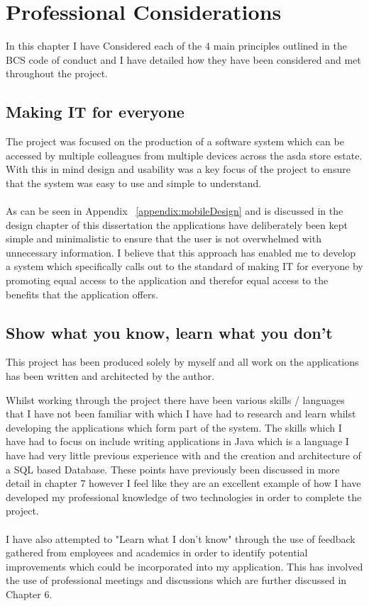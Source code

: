\documentclass[a4paper,11pt]{report}
\begin{document}
\chapter{Professional Considerations}

In this chapter I have Considered each of the 4 main principles outlined in the BCS code of conduct and I have detailed how they have been considered and met throughout the project. 

\section{Making IT for everyone}
The project was focused on the production of a software system which can be accessed by multiple colleagues from multiple devices across the asda store estate.
 With this in mind design and usability was a key focus of the project to ensure that the system was easy to use and simple to understand. 
 \\
 \\
 As can be seen in Appendix ~\ref{appendix:mobileDesign} and is discussed in the design chapter of this dissertation the applications have deliberately been kept simple and minimalistic to ensure that the user is not overwhelmed with unnecessary information.
  I believe that this approach has enabled me to develop a system which specifically calls out to the standard of making IT for everyone by promoting equal access to the application and therefor equal access to the benefits that the application offers. 
\section{Show what you know, learn what you don't}
This project has been produced solely by myself and all work on the applications has been written and architected by the author. 

Whilst working through the project there have been various skills / languages that I have not been familiar with which I have had
to research and learn whilst developing the applications which form part of the system. The skills which I have had to focus on include
writing applications in Java which is a language I have had very little previous experience with and the creation and architecture of a SQL based Database.
These points have previously been discussed in more detail in chapter 7 however I feel like they are an excellent example of how 
I have developed my professional knowledge of two technologies in order to complete the project.
\\
\\
I have also attempted to "Learn what I don't know" through the use of feedback gathered from employees and academics 
in order to identify potential improvements which could be incorporated into my application. 
This has involved the use of professional meetings and discussions which are further discussed in Chapter 6.
\end{document}
